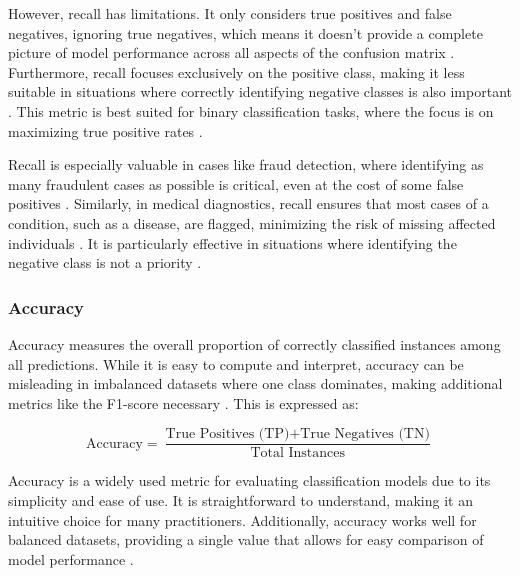 However, recall has limitations. It only considers true positives and false negatives, ignoring true negatives, which means it doesn’t provide a complete picture of model performance across all aspects of the confusion matrix . Furthermore, recall focuses exclusively on the positive class, making it less suitable in situations where correctly identifying negative classes is also important . This metric is best suited for binary classification tasks, where the focus is on maximizing true positive rates \cite{bose_classification_metrics}.

Recall is especially valuable in cases like fraud detection, where identifying as many fraudulent cases as possible is critical, even at the cost of some false positives \cite{appliedai_evaluation_metrics}. Similarly, in medical diagnostics, recall ensures that most cases of a condition, such as a disease, are flagged, minimizing the risk of missing affected individuals \cite{evidentlyai_accuracy_precision_recall} . It is particularly effective in situations where identifying the negative class is not a priority \cite{bose_classification_metrics} .


\subsubsection{Accuracy}
Accuracy measures the overall proportion of correctly classified instances among all predictions. While it is easy to compute and interpret, accuracy can be misleading in imbalanced datasets where one class dominates, making additional metrics like the F1-score necessary \cite{article, dalianis2018clinical}. This is expressed as: 

\begin{equation}
    \text{Accuracy} = \frac{\text{True Positives (TP)} + \text{True Negatives (TN)}}{\text{Total Instances}}
\end{equation}


Accuracy is a widely used metric for evaluating classification models due to its simplicity and ease of use. It is straightforward to understand, making it an intuitive choice for many practitioners. Additionally, accuracy works well for balanced datasets, providing a single value that allows for easy comparison of model performance \cite{bose_classification_metrics}.

